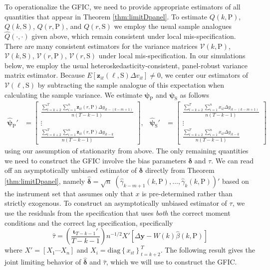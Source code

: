 To operationalize the GFIC, we need to provide appropriate estimators of all quantities that appear in Theorem \ref{thm:limitDpanel}.
To estimate ${Q}(k,\text{P})$, ${Q}(k,\text{S})$, ${Q}(r,\text{P})$, and ${Q}(r,\text{S})$ we employ the usual sample analogues $\widehat{Q}(\cdot,\cdot)$ given above, which remain consistent under local mis-specification.
There are many consistent estimators for the variance matrices $\mathcal{V}(k,\text{P})$, $\mathcal{V}(k,\text{S})$, $\mathcal{V}(r,\text{P})$, $\mathcal{V}(r,\text{S})$ under local mis-specification.
In our simulations below, we employ the usual heteroskedasticity-consistent, panel-robust variance matrix estimator.
Because $E[\mathbf{z}_{it}(\ell,\text{S})\Delta v_{it}]\neq 0$, we center our estimators of $\mathcal{V}(\ell, \text{S})$ by subtracting the sample analogue of this expectation when calculating the sample variance.
We estimate $\boldsymbol{\psi}_{\text{P}}$ and $\boldsymbol{\psi}_{\text{S}}$ as follows
\begin{align*}
  \widehat{\boldsymbol{\psi}}_{\text{P}}' &=\begin{bmatrix}
  \frac{\sum_{t = k+2}^T \sum_{i = 1}^n \mathbf{z}_{it}(r,\text{P}) \Delta y_{it-(k-m+1)}}{n(T-k-1)}\\
  \vdots \\
   \frac{\sum_{t = k+2}^T \sum_{i = 1}^n \mathbf{z}_{it}(r,\text{P}) \Delta y_{it-k}}{n(T-k-1)}
\end{bmatrix},   &
  \widehat{\boldsymbol{\psi}}_{\text{S}}' &=\begin{bmatrix}
   \frac{\sum_{t = k+2}^T \sum_{i = 1}^n x_{it} \Delta y_{it-(k-m+1)}}{n(T-k-1)}\\
   \vdots\\
    \frac{\sum_{t = k+2}^T \sum_{i = 1}^n x_{it} \Delta y_{it-k}}{n(T-k-1)}
\end{bmatrix}  
\end{align*}
using our assumption of stationarity from above.
The only remaining quantities we need to construct the GFIC involve the bias parameters $\boldsymbol{\delta}$ and $\tau$. 
We can read off an asymptotically unbiased estimator of $\boldsymbol{\delta}$ directly from Theorem \ref{thm:limitDpanel}, namely $\widehat{\boldsymbol{\delta}} = \sqrt{n}\; (\widehat{\gamma}_{k-m+1}(k,\text{P}), \ldots, \widehat{\gamma}_k(k,\text{P}))'$ based on the instrument set that assumes only that $x$ is pre-determined rather than strictly exogenous.
To construct an asymptotically unbiased estimator of $\tau$, we use the residuals from the specification that uses \emph{both} the correct moment conditions and the correct lag specification, specifically
\begin{equation}
  \label{eq:DpanelTau}
  \widehat{\tau} = \left( \frac{\boldsymbol{\iota}_{T-k-1}'}{T - k - 1} \right) n^{-1/2} X' \left[\Delta \mathbf{y} - W(k)\widehat{\beta}(k,\text{P})  \right]
\end{equation}
where $X' = [X_1 \cdots X_n]$ and $X_i = \mbox{diag}\left\{ x_{it} \right\}_{t = k + 2}^{T}$.
The following result gives the joint limiting behavior of $\widehat{\boldsymbol{\delta}}$ and $\widehat{\tau}$, which we will use to construct the GFIC.


